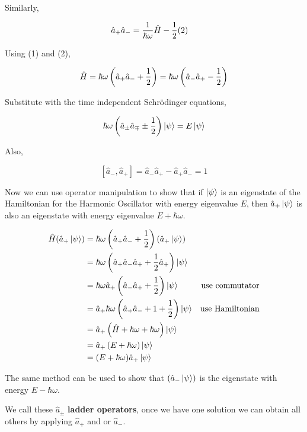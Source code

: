 \documentclass[english, 11pt]{article}
\begin{document}
       Similarly,

       \begin{align*}
         \hat{a}_+\hat{a}_- = \frac{1}{\hbar\omega}\hat{H} - \frac{1}{2} & (2)
       \end{align*}

       Using (1) and (2),

       \[ \hat{H} = \hbar \omega \left(\hat{a}_+\hat{a}_- + \frac{1}{2}\right) = \hbar \omega \left(\hat{a}_-\hat{a}_+ - \frac{1}{2}\right) \]

       Substitute with the time independent Schrödinger equations,

       \[ \hbar\omega \left( \hat{a}_\pm\hat{a}_\mp  \pm \frac{1}{2} \right)\left|\psi\right\rangle = E\left|\psi\right\rangle \]

       Also,

       \[ [\hat{a}_-,\hat{a}_+] = \hat{a}_-\hat{a}_+ - \hat{a}_+\hat{a}_- = 1 \]

       Now we can use operator manipulation to show that if $\left|\psi\right\rangle$ is an eigenstate of the Hamiltonian for the Harmonic Oscillator with energy eigenvalue $E$, then $\hat{a}_+\left|\psi\right\rangle$ is also an eigenstate with energy eigenvalue $E + \hbar \omega$.

       \begin{align*}
         \hat{H} (\hat{a}_+\left|\psi\right\rangle) & = \hbar \omega \left( \hat{a}_+\hat{a}_- + \frac{1}{2} \right)\left( \hat{a}_+\left|\psi\right\rangle \right) \\
         & = \hbar \omega \left( \hat{a}_+\hat{a}_-\hat{a}_+ + \frac{1}{2}\hat{a}_+\right)\left|\psi\right\rangle \\
         & = \hbar \omega \hat{a}_+ \left( \hat{a}_-\hat{a}_+ + \frac{1}{2} \right)\left|\psi\right\rangle & \mbox{use commutator} \\
         & = \hat{a}_+\hbar \omega \left( \hat{a}_+\hat{a}_- + 1 + \frac{1}{2} \right)\left|\psi\right\rangle & \mbox{use Hamiltonian} \\
         & = \hat{a}_+\left( \hat{H} + \hbar \omega + \hbar \omega \right)\left|\psi\right\rangle \\
         & = \hat{a}_+ \left( E + \hbar \omega \right)\left|\psi\right\rangle \\
         & = (E + \hbar \omega) \hat{a}_+\left|\psi\right\rangle
       \end{align*}

       The same method can be used to show that $(\hat{a}_-\left|\psi\right\rangle)$ is the eigenstate with energy $E - \hbar \omega$.\newline

       We call these $\hat{a}_{\pm}$ \textbf{ladder operators}, once we have one solution we can obtain all others by applying $\hat{a}_+$ and or $\hat{a}_-$.
\end{document}
